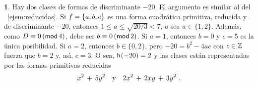 \theoremstyle{plain}
\newtheorem{teoGeneros}{\teoname}[section]
\newtheorem{coroGeneros}[teoGeneros]{\coroname}
\newtheorem{lemaGeneros}[teoGeneros]{\lemaname}

\theoremstyle{definition}
\newtheorem{defGeneros}[teoGeneros]{}
\newtheorem{ejemGeneros}[teoGeneros]{\ejemname}
\newtheorem{obsGeneros}[teoGeneros]{\obsname}


\begin{ejemGeneros}\label{ejem:generos:menos-veinte}
	Hay dos clases de formas de discriminante $-20$.
	El argumento es similar al del \ejemname~\ref{ejem:reducidas}.
	Si $f=\binaria{a,b,c}$ es una forma cuadr\'atica primitiva,
	reducida y de discriminante $-20$, entonces
	$1\leq a\leq\sqrt{20/3}<7$, o sea $a\in\{1,2\}$. Adem\'as,
	como $D\equiv 0\tmodulo[4]$, debe ser $b\equiv 0\tmodulo[2]$. 
	Si $a=1$, entonces $b=0$ y $c=5$ es la \'unica posibilidad.
	Si $a=2$, entonces $b\in\{0,2\}$, pero $-20=b^2-4ac$ con
	$c\in\Enteros$ fuerza que $b=2$ y, as\'{\i}, $c=3$. O sea,
	$\nClases(-20)=2$ y las clases est\'an representadas por
	las formas primitivas reducidas
	\begin{displaymath}
		x^2\,+\,5y^2\dispand 2x^2\,+\,2xy\,+\,3y^2
		\dispstop
	\end{displaymath}


\end{ejemGeneros}
